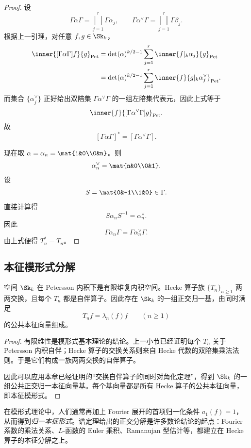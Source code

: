 \begin{proof}
设
\[
\Gamma\alpha\Gamma=\bigsqcup_{j=1}^r \Gamma\alpha_j,
\qquad
\Gamma\alpha^{\vee}\Gamma=\bigsqcup_{j=1}^r \Gamma\beta_j.
\]
根据上一引理，对任意 $f,g\in \Sk_k$，
\begin{align*}
\inner{[\Gamma\alpha\Gamma]f}{g}_{\mathrm{Pet}}
&=\det(\alpha)^{k/2-1}\sum_{j=1}^r \inner{f|_k\alpha_j}{g}_{\mathrm{Pet}}\\
&=\det(\alpha)^{k/2-1}\sum_{j=1}^r \inner{f}{g|_k\alpha_j^{\vee}}_{\mathrm{Pet}}.
\end{align*}
而集合 $\{\alpha_j^{\vee}\}$ 正好给出双陪集 $\Gamma\alpha^{\vee}\Gamma$ 的一组左陪集代表元，因此上式等于
\[
\inner{f}{[\Gamma\alpha^{\vee}\Gamma]g}_{\mathrm{Pet}}.
\]
故
\[
[\Gamma\alpha\Gamma]^*=[\Gamma\alpha^{\vee}\Gamma].
\]

现在取 $\alpha=\alpha_n=\mat{1&0\\0&n}$。则
\[
\alpha_n^{\vee}=\mat{n&0\\0&1}.
\]
设
\[
S=\mat{0&-1\\1&0}\in \Gamma.
\]
直接计算得
\[
S\alpha_nS^{-1}=\alpha_n^{\vee}.
\]
因此
\[
\Gamma\alpha_n\Gamma=\Gamma\alpha_n^{\vee}\Gamma.
\]
由上式便得 $T_n^*=T_n$。
\end{proof}

\subsection{本征模形式分解}

\begin{theorem}
空间 $\Sk_k$ 在 Petersson 内积下是有限维复内积空间。Hecke 算子族 $\{T_n\}_{n\ge 1}$ 两两交换，且每个 $T_n$ 都是自伴算子。因此存在 $\Sk_k$ 的一组正交归一基，由同时满足
\[
T_nf=\lambda_n(f)f\qquad (n\ge 1)
\]
的公共本征向量组成。
\end{theorem}

\begin{proof}
有限维性是模形式基本理论的结论。上一小节已经证明每个 $T_n$ 关于 Petersson 内积自伴；Hecke 算子的交换关系则来自 Hecke 代数的双陪集乘法法则。于是它们构成一族两两交换的自伴算子。

因此可以应用本章已经证明的“交换自伴算子的同时对角化定理”，得到 $\Sk_k$ 的一组公共正交归一本征向量基。每个基向量都是所有 Hecke 算子的公共本征向量，即本征模形式。
\end{proof}

\begin{remark}
在模形式理论中，人们通常再加上 Fourier 展开的首项归一化条件 $a_1(f)=1$，从而得到\emph{归一本征形式}。谱定理给出的正交分解是许多数论结论的起点：Fourier 系数的乘法关系、$L$-函数的 Euler 乘积、Ramanujan 型估计等，都建立在 Hecke 算子的本征分解之上。
\end{remark}

